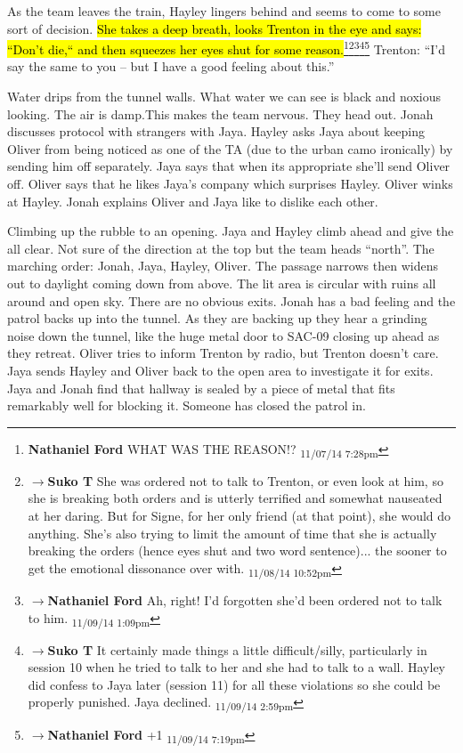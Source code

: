 As the team leaves the train, Hayley lingers behind and seems to come to some sort of decision.  \hl{She takes a deep breath, looks Trenton in the eye and says: ``Don't die,`` and then squeezes her eyes shut for some reason.}\footnote{\textbf{Nathaniel Ford }WHAT WAS THE REASON!? \textsubscript{11/07/14 7:28pm}}\footnote{$\rightarrow$\textbf{Suko T }She was ordered not to talk to Trenton, or even look at him, so she is breaking both orders and is utterly terrified and somewhat nauseated at her daring.  But for Signe, for her only friend (at that point), she would do anything.  She's also trying to limit the amount of time that she is actually breaking the orders (hence eyes shut and two word sentence)... the sooner to get the emotional dissonance over with. \textsubscript{11/08/14 10:52pm}}\footnote{$\rightarrow$\textbf{Nathaniel Ford }Ah, right! I'd forgotten she'd been ordered not to talk to him. \textsubscript{11/09/14 1:09pm}}\footnote{$\rightarrow$\textbf{Suko T }It certainly made things a little difficult/silly, particularly in session 10 when he tried to talk to her and she had to talk to a wall.  Hayley did confess to Jaya later (session 11) for all these violations so she could be properly punished.  Jaya declined. \textsubscript{11/09/14 2:59pm}}\footnote{$\rightarrow$\textbf{Nathaniel Ford }+1 \textsubscript{11/09/14 7:19pm}}  Trenton: ``I'd say the same to you – but I have a good feeling about this.''



Water drips from the tunnel walls.  What water we can see is black and noxious looking.    The air is damp.This makes the team nervous.  They head out.  Jonah discusses protocol with strangers with Jaya.  Hayley asks Jaya about keeping Oliver from being noticed as one of the TA (due to the urban camo ironically) by sending him off separately.  Jaya says that when its appropriate she'll send Oliver off.  Oliver says that he likes Jaya's company which surprises Hayley.  Oliver winks at Hayley.  Jonah explains Oliver and Jaya like to dislike each other.



Climbing up the rubble to an opening. Jaya and Hayley climb ahead and give the all clear.  Not sure of the direction at the top but the team heads ``north''.  The marching order: Jonah, Jaya, Hayley, Oliver.  The passage narrows then widens out to daylight coming down from above. The lit area is circular with ruins all around and open sky.  There are no obvious exits.  Jonah has a bad feeling and the patrol backs up into the tunnel.  As they are backing up they hear a grinding noise down the tunnel, like the huge metal door to SAC-09 closing up ahead as they retreat.  Oliver tries to inform Trenton by radio, but Trenton doesn't care. Jaya sends Hayley and Oliver back to the open area to investigate it for exits.  Jaya and Jonah find that hallway is sealed by a piece of metal that fits remarkably well for blocking it.  Someone has closed the patrol in.



